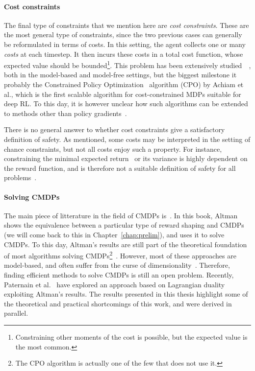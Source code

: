 		\paragraph{Cost constraints} The final type of constraints that we mention here are\emph{ cost constraints}. These are the most general type of constraints, since the two previous cases can generally be reformulated in terms of costs. In this setting, the agent collects one or many\emph{ costs} at each timestep. It then incurs these costs in a total cost function, whose expected value should be bounded\footnote{Constraining other moments of the cost is possible, but the expected value is the most common.}. This problem has been extensively studied~\cite{garcia2015comprehensive}~\cite{kim2012cost}, both in the model-based and model-free settings, but the biggest milestone it probably the Constrained Policy Optimization~\cite{achiam2017constrained} algorithm (CPO) by Achiam et al., which is the first scalable algorithm for cost-constrained MDPs suitable for deep RL. To this day, it is however unclear how such algorithms can be extended to methods other than policy gradients~\cite{chow2018lyapunov}. \par
		There is no general answer to whether cost constraints give a satisfactory definition of safety. As mentioned, some costs may be interpreted in the setting of chance constraints, but not all costs enjoy such a property. For instance, constraining the minimal expected return~\cite{hans2008safe} or its variance is highly dependent on the reward function, and is therefore not a suitable definition of safety for all problems~\cite{garcia2015comprehensive}.
		\paragraph{Solving CMDPs} The main piece of litterature in the field of CMDPs is~\cite{altman1999constrained}. In this book, Altman shows the equivalence between a particular type of reward shaping and CMDPs (we will come back to this in Chapter~\ref{chap:prelim}), and uses it to solve CMDPs. To this day, Altman's results are still part of the theoretical foundation of most algorithms solving CMDPs\footnote{The CPO algorithm is actually one of the few that does not use it.}~\cite{zheng2020constrained}. However, most of these approaches are model-based, and often suffer from the curse of dimensionality~\cite{kim2012cost}. Therefore, finding efficient methods to solve CMDPs is still an open problem. Recently, Paternain et al.~\cite{paternain2019safe} have explored an approach based on Lagrangian duality exploiting Altman's results. The results presented in this thesis highlight some of the theoretical and practical shortcomings of this work, and were derived in parallel.
		
